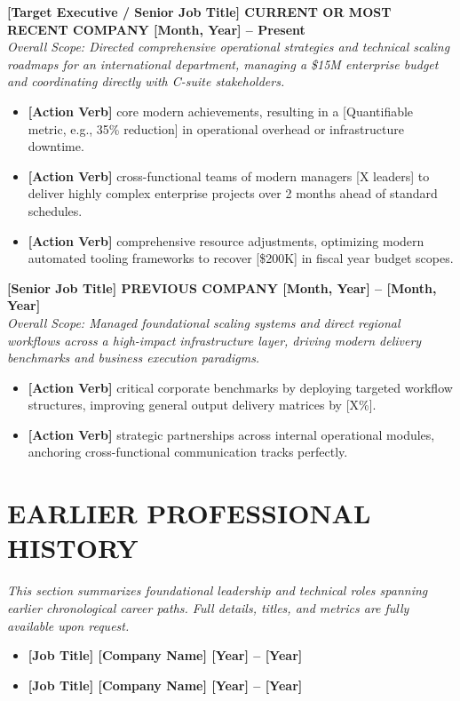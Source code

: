 \documentclass[10pt,a4paper]{article}
\newcommand{\resumeline}{\vspace{-8pt}\noindent\makebox[\linewidth]{\rule{\linewidth}{0.5pt}}\vspace{4pt}}
\begin{document}
	\noindent \textbf{[Target Executive / Senior Job Title] \textbar{} CURRENT OR MOST RECENT COMPANY \textbar{} [Month, Year] -- Present} \\
	\noindent \textit{Overall Scope: Directed comprehensive operational strategies and technical scaling roadmaps for an international department, managing a \$15M enterprise budget and coordinating directly with C-suite stakeholders.}
	\begin{itemize}
		\item \textbf{[Action Verb]} core modern achievements, resulting in a [Quantifiable metric, e.g., 35\% reduction] in operational overhead or infrastructure downtime.
		\item \textbf{[Action Verb]} cross-functional teams of modern managers [X leaders] to deliver highly complex enterprise projects over 2 months ahead of standard schedules.
		\item \textbf{[Action Verb]} comprehensive resource adjustments, optimizing modern automated tooling frameworks to recover [\$200K] in fiscal year budget scopes.
	\end{itemize}
	
	\vspace{6pt}
	
	\noindent \textbf{[Senior Job Title] \textbar{} PREVIOUS COMPANY \textbar{} [Month, Year] -- [Month, Year]} \\
	\noindent \textit{Overall Scope: Managed foundational scaling systems and direct regional workflows across a high-impact infrastructure layer, driving modern delivery benchmarks and business execution paradigms.}
	\begin{itemize}
		\item \textbf{[Action Verb]} critical corporate benchmarks by deploying targeted workflow structures, improving general output delivery matrices by [X\%].
		\item \textbf{[Action Verb]} strategic partnerships across internal operational modules, anchoring cross-functional communication tracks perfectly.
	\end{itemize}
	
	\section*{EARLIER PROFESSIONAL HISTORY}
	\resumeline
	
	\noindent \textit{This section summarizes foundational leadership and technical roles spanning earlier chronological career paths. Full details, titles, and metrics are fully available upon request.}
	\begin{itemize}
		\item \textbf{[Job Title] \textbar{} [Company Name] \textbar{} [Year] -- [Year]}
		\item \textbf{[Job Title] \textbar{} [Company Name] \textbar{} [Year] -- [Year]}
	\end{itemize}
	
\end{document}
